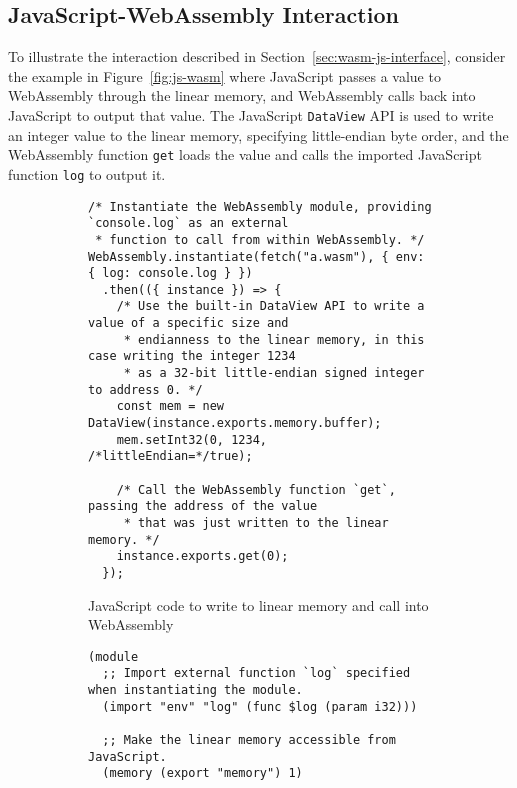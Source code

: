\begin{appendices}

\chapter{JavaScript-WebAssembly Interaction}

\label{appendix:shared-memory}

To illustrate the interaction described in Section~\ref{sec:wasm-js-interface}, consider the example in Figure~\ref{fig:js-wasm} where JavaScript passes a value to WebAssembly through the linear memory, and WebAssembly calls back into JavaScript to output that value. The JavaScript \texttt{DataView} API is used to write an integer value to the linear memory, specifying little-endian byte order, and the WebAssembly function \texttt{get} loads the value and calls the imported JavaScript function \texttt{log} to output it.

\begin{figure}[H]
\centering
\begin{subfigure}{\textwidth}
\begin{verbatim}
/* Instantiate the WebAssembly module, providing `console.log` as an external
 * function to call from within WebAssembly. */
WebAssembly.instantiate(fetch("a.wasm"), { env: { log: console.log } })
  .then(({ instance }) => {
    /* Use the built-in DataView API to write a value of a specific size and
     * endianness to the linear memory, in this case writing the integer 1234
     * as a 32-bit little-endian signed integer to address 0. */
    const mem = new DataView(instance.exports.memory.buffer);
    mem.setInt32(0, 1234, /*littleEndian=*/true);

    /* Call the WebAssembly function `get`, passing the address of the value
     * that was just written to the linear memory. */
    instance.exports.get(0);
  });
\end{verbatim}
\caption{JavaScript code to write to linear memory and call into WebAssembly}
\end{subfigure}
\par\bigskip
\par\bigskip
\begin{subfigure}{\textwidth}
\begin{verbatim}
(module
  ;; Import external function `log` specified when instantiating the module.
  (import "env" "log" (func $log (param i32)))

  ;; Make the linear memory accessible from JavaScript.
  (memory (export "memory") 1)


\end{verbatim}
\end{subfigure}
\end{figure}
\end{appendices}
